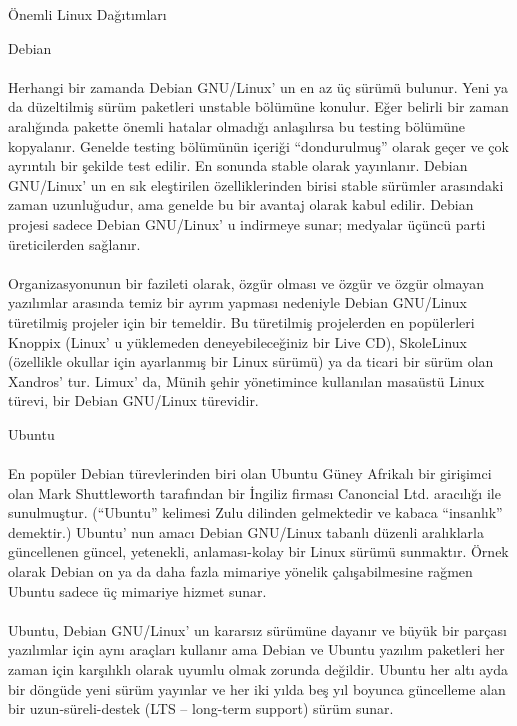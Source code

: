 \documentclass[10pt,a5paper]{book}
\begin{document}
\begin{section}{Önemli Linux Dağıtımları}
\begin{subsection}{Debian}
\paragraph{}{Herhangi bir zamanda Debian GNU/Linux' un en az üç sürümü bulunur. Yeni ya da düzeltilmiş sürüm paketleri unstable bölümüne konulur. Eğer belirli bir zaman aralığında pakette önemli hatalar olmadığı anlaşılırsa bu testing bölümüne kopyalanır. Genelde testing bölümünün içeriği “dondurulmuş” olarak geçer ve çok ayrıntılı bir şekilde test edilir. En sonunda stable olarak yayınlanır. Debian GNU/Linux' un en sık eleştirilen özelliklerinden birisi stable sürümler arasındaki zaman uzunluğudur, ama genelde bu bir avantaj olarak kabul edilir. Debian projesi sadece Debian GNU/Linux' u indirmeye sunar; medyalar üçüncü parti üreticilerden sağlanır.}
\paragraph{}{Organizasyonunun bir fazileti olarak, özgür olması ve özgür ve özgür olmayan yazılımlar arasında temiz bir ayrım yapması nedeniyle Debian GNU/Linux türetilmiş projeler için bir temeldir. Bu türetilmiş projelerden en popülerleri Knoppix (Linux' u yüklemeden deneyebileceğiniz bir Live CD), SkoleLinux (özellikle okullar için ayarlanmış bir Linux sürümü) ya da ticari bir sürüm olan Xandros' tur. Limux' da, Münih şehir yönetimince kullanılan masaüstü Linux türevi, bir Debian GNU/Linux türevidir.}
\end{subsection}
\begin{subsection}{Ubuntu}
\paragraph{}{En popüler Debian türevlerinden biri olan Ubuntu Güney Afrikalı bir girişimci olan Mark Shuttleworth tarafından bir İngiliz firması Canoncial Ltd. aracılığı ile sunulmuştur. (“Ubuntu” kelimesi Zulu dilinden gelmektedir ve kabaca “insanlık” demektir.) Ubuntu' nun amacı Debian GNU/Linux tabanlı düzenli aralıklarla güncellenen güncel, yetenekli, anlaması-kolay bir Linux sürümü sunmaktır. Örnek olarak Debian on ya da daha fazla mimariye yönelik çalışabilmesine rağmen Ubuntu sadece üç mimariye hizmet sunar.}
\paragraph{}{Ubuntu, Debian GNU/Linux' un kararsız sürümüne dayanır ve büyük bir parçası yazılımlar için aynı araçları kullanır ama Debian ve Ubuntu yazılım paketleri her zaman için karşılıklı olarak uyumlu olmak zorunda değildir. Ubuntu her altı ayda bir döngüde yeni sürüm yayınlar ve her iki yılda beş yıl boyunca güncelleme alan bir uzun-süreli-destek (LTS – long-term support) sürüm sunar.}

\end{subsection}
\end{section}
\end{document}
